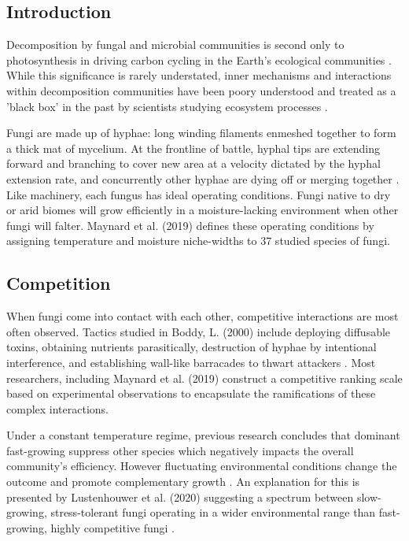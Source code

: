 \documentclass[12pt]{article}
\begin{document}
\begin{multicols}{2}
	
	
\section{Introduction}

Decomposition by fungal and microbial communities is second only to photosynthesis in driving carbon cycling in the Earth's ecological communities \cite{McGuire2010}. While this significance is rarely understated, inner mechanisms and interactions within decomposition communities have been poory understood and treated as a 'black box' in the past by scientists studying ecosystem processes \cite{Andren1999}.

Fungi are made up of hyphae: long winding filaments enmeshed together to form a thick mat of mycelium. At the frontline of battle, hyphal tips are extending forward and branching to cover new area at a velocity dictated by the hyphal extension rate, and concurrently other hyphae are dying off or merging together \cite{Edelstein1982}. Like machinery, each fungus has ideal operating conditions. Fungi native to dry or arid biomes will grow efficiently in a moisture-lacking environment when other fungi will falter. Maynard et al. (2019) defines these operating conditions by assigning temperature and moisture niche-widths to 37 studied species of fungi. 

\subsection{Competition}
When fungi come into contact with each other, competitive interactions are most often observed. Tactics studied in Boddy, L. (2000) include deploying diffusable toxins, obtaining nutrients parasitically, destruction of hyphae by intentional interference, and establishing wall-like barracades to thwart attackers \cite{Boddy2000}. Most researchers, including Maynard et al. (2019) construct a competitive ranking scale based on experimental observations to encapsulate the ramifications of these complex interactions. 

Under a constant temperature regime, previous research concludes that dominant fast-growing suppress other species which negatively impacts the overall community's efficiency. However fluctuating environmental conditions change the outcome and promote complementary growth \cite{Toljander2006}. An explanation for this is presented by Lustenhouwer et al. (2020) suggesting a spectrum between slow-growing, stress-tolerant fungi operating in a wider environmental range than fast-growing, highly competitive fungi \cite{Lustenhouwer2020}. 


\end{multicols}
\end{document}
